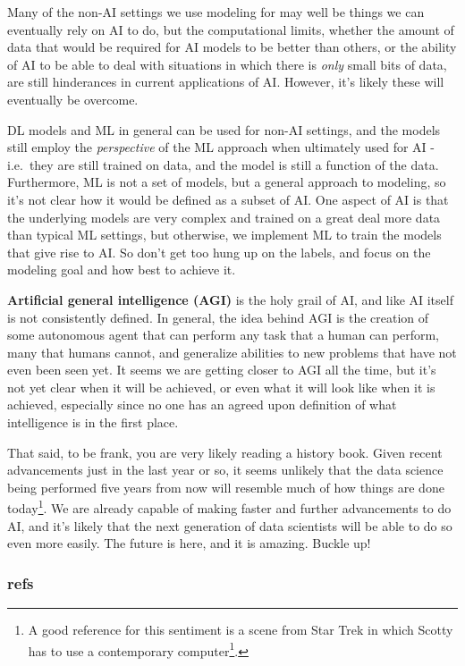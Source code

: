\documentclass[
  letterpaper,
]{krantz}
\DeclareRobustCommand{\href}[2]{#2\footnote{\url{#1}}}
\begin{document}
Many of the non-AI settings we use modeling for may well be things we
can eventually rely on AI to do, but the computational limits, whether
the amount of data that would be required for AI models to be better
than others, or the ability of AI to be able to deal with situations in
which there is \emph{only} small bits of data, are still hinderances in
current applications of AI. However, it's likely these will eventually
be overcome.

DL models and ML in general can be used for non-AI settings, and the
models still employ the \emph{perspective} of the ML approach when
ultimately used for AI - i.e.~they are still trained on data, and the
model is still a function of the data. Furthermore, ML is not a set of
models, but a general approach to modeling, so it's not clear how it
would be defined as a subset of AI. One aspect of AI is that the
underlying models are very complex and trained on a great deal more data
than typical ML settings, but otherwise, we implement ML to train the
models that give rise to AI. So don't get too hung up on the labels, and
focus on the modeling goal and how best to achieve it.

\textbf{Artificial general intelligence (AGI)} is the holy grail of AI,
and like AI itself is not consistently defined. In general, the idea
behind AGI is the creation of some autonomous agent that can perform any
task that a human can perform, many that humans cannot, and generalize
abilities to new problems that have not even been seen yet. It seems we
are getting closer to AGI all the time, but it's not yet clear when it
will be achieved, or even what it will look like when it is achieved,
especially since no one has an agreed upon definition of what
intelligence is in the first place.

That said, to be frank, you are very likely reading a history book.
Given recent advancements just in the last year or so, it seems unlikely
that the data science being performed five years from now will resemble
much of how things are done today\footnote{A good reference for this
  sentiment is a scene from Star Trek in which
  \href{https://www.youtube.com/watch?v=hShY6xZWVGE}{Scotty has to use a
  contemporary computer}.}. We are already capable of making faster and
further advancements to do AI, and it's likely that the next generation
of data scientists will be able to do so even more easily. The future is
here, and it is amazing. Buckle up!

\subsubsection{refs}\label{refs-3}
\end{document}
